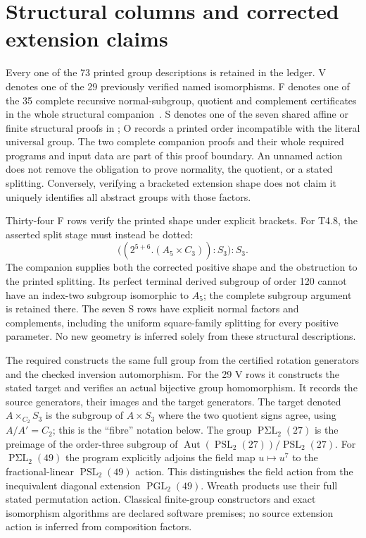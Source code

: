 \documentclass[10pt,a4paper]{article}
\begin{document}
\section{Structural columns and corrected extension claims}
Every one of the 73 printed group descriptions is retained in the ledger.
V denotes one of the 29 previously verified named isomorphisms. F denotes
one of the 35 complete recursive normal-subgroup, quotient and complement
certificates in the whole structural companion~\cite{finite-structures}.
S denotes one of the seven shared affine or finite structural proofs in
\cite{shared-structures}; O records a printed order incompatible with the
literal universal group. The two complete companion proofs and their
whole required programs and input data are part of this proof boundary.
An unnamed action does not remove the obligation to prove normality,
the quotient, or a stated splitting. Conversely, verifying a bracketed
extension shape does not claim it uniquely identifies all abstract groups
with those factors.

Thirty-four F rows verify the printed shape under explicit brackets.
For T4.8, the asserted split stage must instead be dotted:
\[
 \bigl((2^{5+6}.(A_5\times C_3)):S_3\bigr):S_3.
\]
The companion supplies both the corrected positive shape and the
obstruction to the printed splitting. Its perfect terminal derived
subgroup of order 120 cannot have an index-two subgroup isomorphic to
$A_5$; the complete subgroup argument is retained there.
The seven S rows have explicit normal factors and complements, including
the uniform square-family splitting for every positive parameter.
No new geometry is inferred solely from these structural descriptions.

The required  constructs the same full group from
the certified rotation generators and the checked inversion automorphism.
For the 29 V rows it constructs the stated target and verifies an actual
bijective group homomorphism. It records the source generators, their images
and the target generators. The target denoted $A\mathbin{\times_{C_2}}S_3$
is the subgroup of $A\times S_3$ where the two quotient signs agree, using
$A/A'=C_2$; this is the ``fibre'' notation below. The group
$\operatorname{P\Sigma L}_2(27)$ is the preimage of the order-three subgroup
of $\operatorname{Aut}(\operatorname{PSL}_2(27))/\operatorname{PSL}_2(27)$.
For $\operatorname{P\Sigma L}_2(49)$ the program explicitly adjoins the field
map $u\mapsto u^7$ to the fractional-linear $\operatorname{PSL}_2(49)$
action. This distinguishes the field action from the inequivalent diagonal
extension $\operatorname{PGL}_2(49)$. Wreath products use their full stated
permutation action. Classical finite-group constructors and exact isomorphism
algorithms are declared software premises; no source extension action is
inferred from composition factors.
\end{document}
